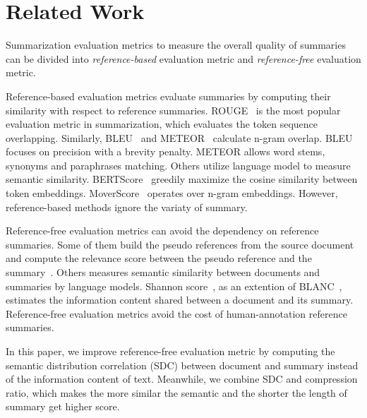 \section{Related Work}
Summarization evaluation metrics to measure the overall quality of summaries
can be divided into {\em reference-based} evaluation metric and 
{\em reference-free} evaluation metric.

Reference-based evaluation metrics evaluate summaries by computing their similarity
with respect to reference summaries.
ROUGE~\cite{rouge} is the most popular evaluation metric in summarization, 
which evaluates the token sequence overlapping.
Similarly, BLEU~\cite{bleu2002} and METEOR~\cite{meteor2005} 
calculate n-gram overlap.
BLEU focuses on precision with a brevity penalty. 
METEOR allows word stems, synonyms and paraphrases matching.
Others utilize language model to measure semantic
similarity.
BERTScore~\cite{bertscore} greedily 
maximize the cosine similarity between token embeddings.
MoverScore~\cite{moverscore} operates
over n-gram embeddings.
However, reference-based methods ignore the variaty of summary.

Reference-free evaluation metrics can
avoid the dependency on reference summaries.
Some of them build the pseudo references from the source
document and compute the relevance score between the pseudo
reference and the summary~\cite{gao-etal-2020-supert,chen2021training}.
Others measures semantic similarity between documents and summaries by language models. 
Shannon score~\cite{shannon22}, as an extention of BLANC~\cite{blanc}, estimates the information content shared between a document and its summary.
Reference-free evaluation metrics avoid the cost of human-annotation reference summaries.

In this paper,  
we improve reference-free evaluation metric by computing the semantic distribution correlation (SDC) between document and summary instead of the information content of text. 
Meanwhile, we combine SDC and compression ratio, which makes the more similar the semantic and the shorter the length of summary get higher score.

